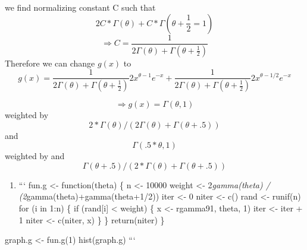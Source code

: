 \documentclass[]{article}
\providecommand{\tightlist}{%
  \setlength{\itemsep}{0pt}\setlength{\parskip}{0pt}}
\begin{document}
we find normalizing constant C such that
\[2C*\Gamma(\theta)+C*\Gamma(\theta+\frac{1}{2}=1)\]
\[\Rightarrow C=\frac{1}{2\Gamma(\theta)+\Gamma(\theta+\frac{1}{2})}\]
Therefore we can change \(g(x)\) to
\[g(x)=\frac{1}{2\Gamma(\theta)+\Gamma(\theta+\frac{1}{2})}2x^{\theta-1}e^{-x}+\frac{1}{2\Gamma(\theta)+\Gamma(\theta+\frac{1}{2})}2x^{\theta-1/2}e^{-x}\]

\[\Rightarrow g(x) = \Gamma (\theta, 1)\] weighted by
\[2 * \Gamma(\theta) / (2\Gamma(\theta)+\Gamma(\theta+.5))\] and
\[ \Gamma (.5*\theta, 1)\] weighted by and
\[\Gamma(\theta+.5) / (2 * \Gamma(\theta)+\Gamma(\theta+.5))\]

\begin{enumerate}
\def\labelenumi{\alph{enumi})}
\setcounter{enumi}{1}
\tightlist
\item
  ``` fun.g \textless{}- function(theta) \{ n \textless{}- 10000 weight
  \textless{}- 2\emph{gamma(theta) / (2}gamma(theta)+gamma(theta+1/2))
  iter \textless{}- 0 niter \textless{}- c() rand \textless{}- runif(n)
  for (i in 1:n) \{ if (rand{[}i{]} \textless{} weight) \{ x
  \textless{}- rgamma91, theta, 1) iter \textless{}- iter + 1 niter
  \textless{}- c(niter, x) \} \} return(niter) \}
\end{enumerate}

graph.g \textless{}- fun.g(1) hist(graph.g) ```
\end{document}
